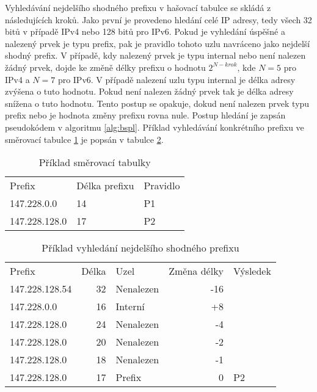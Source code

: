 Vyhledávání nejdelšího shodného prefixu v hašovací tabulce se skládá z následujících kroků.
Jako první je provedeno hledání celé IP adresy, tedy všech 32 bitů v případě IPv4 nebo 128 bitů pro IPv6.
Pokud je vyhledání úspěšné a nalezený prvek je typu prefix, pak je pravidlo tohoto uzlu navráceno
jako nejdelší shodný prefix. V případě, kdy nalezený prvek je typu internal nebo není nalezen žádný prvek, dojde ke změně délky prefixu o hodnotu $2^{N - krok}$, kde $N = 5$ pro IPv4 a $N = 7$ pro IPv6.
V případě nalezení uzlu typu internal je délka adresy zvýšena o tuto hodnotu.
Pokud není nalezen žádný prvek tak je délka adresy snížena o tuto hodnotu.
Tento postup se opakuje, dokud není nalezen prvek typu prefix nebo je hodnota změny prefixu rovna nule.
Postup hledání je zapsán pseudokódem v algoritmu \ref{alg:bspl}.
Příklad vyhledávání konkrétního prefixu ve směrovací tabulce \ref{tab:bspl-table-example} je popsán v tabulce \ref{tab:bspl-example}.

\begin{table}[!htbp]
	\center
    \begin{tabular}{|l|l|l|}
    \hline
    Prefix        & Délka prefixu & Pravidlo \\ \hhline{|=|=|=|}
    147.228.0.0   & 14            & P1       \\ \hline
    147.228.128.0 & 17            & P2       \\ \hline
    \end{tabular}
    \caption{Příklad směrovací tabulky}
    \label{tab:bspl-table-example}
\end{table}

\begin{table}[!htbp]
	\center
    \begin{tabular}{|l|r|l|r|l|}
    \hline
    Prefix & Délka & Uzel & Změna délky & Výsledek \\ \hhline{|=|=|=|=|=|}
    147.228.128.54 & 32 & Nenalezen & -16 &  \\ \hline
    147.228.0.0 & 16 & Interní & +8 &  \\ \hline
    147.228.128.0 & 24 & Nenalezen & -4 &  \\ \hline
    147.228.128.0 & 20 & Nenalezen & -2 &  \\ \hline
    147.228.128.0 & 18 & Nenalezen & -1 &  \\ \hline
    147.228.128.0 & 17 & Prefix & 0 & P2 \\ \hline
    \end{tabular}
    \caption{Příklad vyhledání nejdelšího shodného prefixu}
    \label{tab:bspl-example}
\end{table}

